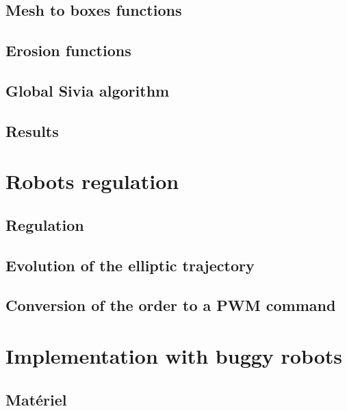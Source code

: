 \documentclass[12pt,fleqn]{report} %
\begin{document}
\section{Mesh to boxes functions}


\section{Erosion functions}


\section{Global Sivia algorithm}


\section{Results}



\chapter{Robots regulation}

\section{Regulation}


\section{Evolution of the elliptic trajectory}


\section{Conversion of the order to a PWM command}



\chapter{Implementation with buggy robots}
\section{Matériel}

\end{document}
